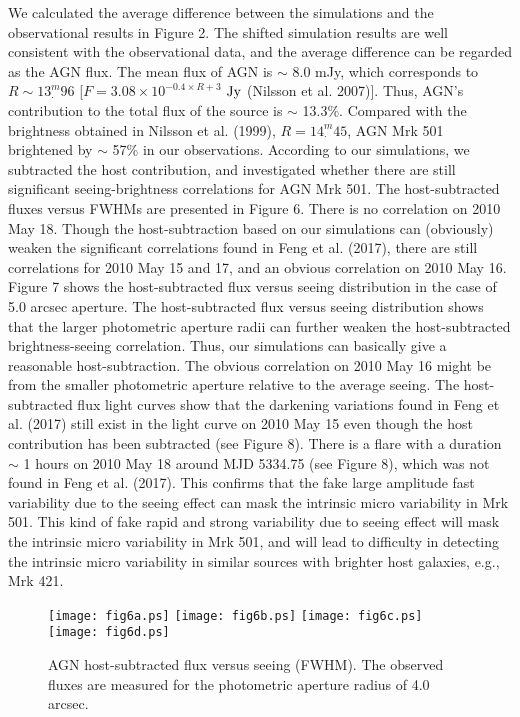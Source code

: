 \documentclass[structabstract]{raa}
\begin{document}
   We calculated the average difference between the simulations and the observational results in Figure 2. The shifted simulation
   results are well consistent with the observational data, and the average difference can be regarded as the AGN flux. The mean
   flux of AGN is $\sim$ 8.0 mJy, which corresponds to $R\sim13^{m}_{\cdot}96$ [$F = 3.08 \times 10^{-0.4 \times R+3}$ $\rm{Jy}$
   (Nilsson et al. 2007)]. Thus, AGN's contribution to the total flux of the source is $\sim$ 13.3\%. Compared with the brightness
   obtained in Nilsson et al. (1999), $R=14^{m}_{\cdot}45$, AGN Mrk 501 brightened by $\sim$ 57\% in our observations. According
   to our simulations, we subtracted the host contribution, and investigated whether there are still significant seeing-brightness
   correlations for AGN Mrk 501. The host-subtracted fluxes versus FWHMs are presented in Figure 6. There is no correlation on
   2010 May 18. Though the host-subtraction based on our simulations can (obviously) weaken the significant correlations found
   in Feng et al. (2017), there are still correlations for 2010 May 15 and 17, and an obvious correlation on 2010 May 16. Figure 7
   shows the host-subtracted flux versus seeing distribution in the case of 5.0 arcsec aperture. The host-subtracted flux versus seeing
   distribution shows that the larger photometric aperture radii can further weaken the host-subtracted brightness-seeing correlation.
   Thus, our simulations can basically give a reasonable host-subtraction. The obvious correlation on 2010 May 16 might be from
   the smaller photometric aperture relative to the average seeing.  The host-subtracted flux light curves show that the darkening
   variations found in Feng et al. (2017) still exist in the light curve on 2010 May 15 even though the host contribution has been
   subtracted (see Figure 8). There is a flare with a duration $\sim$ 1 hours on 2010 May 18 around MJD 5334.75 (see Figure 8), which
   was not found in Feng et al. (2017). This confirms that the fake large amplitude fast variability due to the seeing effect can mask
   the intrinsic micro variability in Mrk 501. This kind of fake rapid and strong variability due to seeing effect will mask the intrinsic
   micro variability in Mrk 501, and will lead to difficulty in detecting the intrinsic micro variability in similar sources with brighter
   host galaxies, e.g., Mrk 421.
   \begin{figure}
   \begin{center}
     \texttt{[image: fig6a.ps]}
     \texttt{[image: fig6b.ps]}
     \texttt{[image: fig6c.ps]}
     \texttt{[image: fig6d.ps]}
    \end{center}
  \caption{AGN host-subtracted flux versus seeing (FWHM). The observed fluxes are measured for the photometric
     aperture radius of 4.0 arcsec.}
  \label{fig6}
\end{figure}
\end{document}
